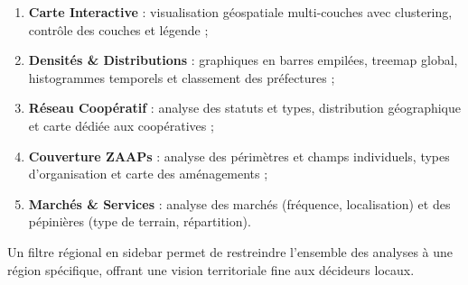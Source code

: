 \documentclass[12pt, a4paper]{article}
\begin{document}
\begin{enumerate}[leftmargin=1.5em]
    \item \textbf{Carte Interactive} : visualisation géospatiale multi-couches avec clustering,
          contrôle des couches et légende ;
    \item \textbf{Densités \& Distributions} : graphiques en barres empilées, treemap global,
          histogrammes temporels et classement des préfectures ;
    \item \textbf{Réseau Coopératif} : analyse des statuts et types, distribution géographique
          et carte dédiée aux coopératives ;
    \item \textbf{Couverture ZAAPs} : analyse des périmètres et champs individuels, types
          d'organisation et carte des aménagements ;
    \item \textbf{Marchés \& Services} : analyse des marchés (fréquence, localisation) et
          des pépinières (type de terrain, répartition).
\end{enumerate}

Un filtre régional en sidebar permet de restreindre l'ensemble des analyses à une région spécifique,
offrant une vision territoriale fine aux décideurs locaux.
\end{document}
